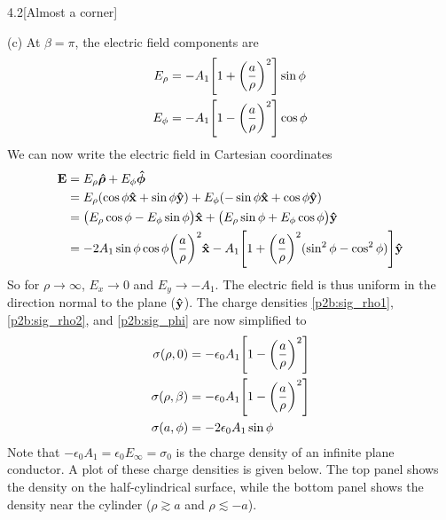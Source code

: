 \documentclass[12pt]{article}
\begin{document}
\begin{problem}{4.2}[Almost a corner]
\begin{solution}
(c) At $\beta=\pi$, the electric field components are
\begin{subequations}
    \begin{align}
        E_\rho&=-A_1\qty[1+\qty(\frac{a}{\rho})^2]\sin\phi\\ 
        E_\phi&=-A_1\qty[1-\qty(\frac{a}{\rho})^2]\cos\phi
    \end{align} 
\end{subequations}
We can now write the electric field in Cartesian coordinates
\begin{align}
    \vb{E}&=E_\rho\bm{\hat\rho}+E_\phi\bm{\hat{\phi}}\notag\\
          &=E_\rho(\cos\phi\vb{\hat{x}}+\sin\phi\vb{\hat{y}})+E_\phi(-\sin\phi\vb{\hat{x}}+\cos\phi\vb{\hat{y}})\notag\\
          &=\qty(E_\rho\cos\phi-E_\phi\sin\phi)\vb{\hat{x}}
          +\qty(E_\rho\sin\phi+E_\phi\cos\phi)\vb{\hat{y}}\notag\\
          &=-2A_1\sin\phi\cos\phi\qty(\frac{a}{\rho})^2\vb{\hat{x}}
          -A_1\qty[1+\qty(\frac{a}{\rho})^2(\sin^2\phi-\cos^2\phi)]\vb{\hat{y}}
\end{align}
So for $\rho\to\infty$, $E_x\to 0$ and $E_y\to -A_1$. The electric field is thus
uniform in the direction normal to the plane ($\vb{\hat{y}}$). The charge densities
\eqref{p2b:sig_rho1}, \eqref{p2b:sig_rho2}, and \eqref{p2b:sig_phi} are now
simplified to
\begin{subequations}
    \begin{align}
        \sigma(\rho,0)&=-\epsilon_0A_1\qty[1-\qty(\frac{a}{\rho})^2]\label{p2c:sig_rho1}\\ 
        \sigma(\rho,\beta)&=-\epsilon_0A_1\qty[1-\qty(\frac{a}{\rho})^2]\label{p2c:sig_rho2}\\ 
        \sigma(a,\phi)&=-2\epsilon_0A_1\sin\phi\label{p2c:sig_cyl}
    \end{align} 
\end{subequations}
Note that $-\epsilon_0A_1=\epsilon_0E_\infty=\sigma_0$ is the charge density of
an infinite plane conductor. A plot of these charge densities is given below.
The top panel shows the density on the half-cylindrical surface, while the
bottom panel shows the density near the cylinder ($\rho\gtrsim a$ and
$\rho\lesssim-a$).
\begin{center}

\end{center}
\end{solution}
\end{problem}
\end{document}
